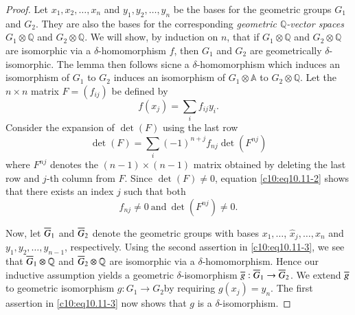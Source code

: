 \begin{proof}
  Let $x_1, x_2, \ldots , x_n$ and $y_1, y_2, \ldots, y_n$ be the
  bases for the geometric groups $G_1$ and $G_2$. They are also the
  bases for the corresponding \textit{geometric $\mathbb{Q}$-vector
    spaces $G_1 \otimes \mathbb{Q}$} and $G_2 \otimes \mathbb{Q}$. We
  will show, by induction on $n$, that if $G_1 \otimes \mathbb{Q}$ and
  $G_2 \otimes \mathbb{Q}$ are isomorphic via a $\delta$-homomorphism
  $f$, then $G_1$ and $G_2$ are geometrically $\delta$-isomorphic. The
  lemma then follows sicne a $\delta$-homomorphism which induces an
  isomorphism of $G_1$ to $G_2$ induces an isomorphism of $G_1 \otimes
  \mathbb{A}$ to $G_2 \otimes \mathbb{Q}$. Let the $n \times n$ matrix
  $F= (f_{ij})$ be defined by 
  \begin{equation*}
    f(x_j) = \sum_{i} f_{ij}y_i.\tag{1}\label{c10:eq10.11-1}
  \end{equation*}
  Consider the expansion of $\det (F)$ using the last row
  \begin{equation*}
    \det (F) = \sum_i (-1)^{n+j} f_{nj} \det (F^{nj})\tag{2}\label{c10:eq10.11-2}
  \end{equation*}
  where $F^{nj}$ denotes the $(n-1) \times (n-1)$ matrix obtained by
  deleting the last row and $j$-th column from $F$. Since $\det
  (F)\neq 0$, equation \eqref{c10:eq10.11-2} shows that there exists
  an index $j$ such that both
  \begin{equation*}
    f_{nj} \neq 0 ~\text{and}~ \det (F^{nj}) \neq
    0.\tag{3} \label{c10:eq10.11-3}
  \end{equation*}

Now, let $\overline{G}_1$ and $\overline{G}_2$ denote the geometric groups with
bases $x_1, \ldots$, $\hat{x}_j, \ldots, x_n$ and $y_1, y_2, \ldots,
y_{n-1}$, respectively. Using the second assertion in
\eqref{c10:eq10.11-3}, we see that $\overline{G}_1 \otimes \mathbb{Q}$ and
$\overline{G}_2 \otimes \mathbb{Q}$ are isomorphic via a
$\delta$-homomorphism. Hence our inductive assumption yields a
geometric $\delta$-isomorphism $\overline{g}: \overline{G}_1 \to \overline{G}_2$. We
extend $\overline{g}$ to geometric isomorphism $g: G_1 \to
G_2$\pageoriginale by requiring 
$g(x_j)= y_n$. The first assertion in \eqref{c10:eq10.11-3} now shows
that $g$ is a $\delta$-isomorphism.
\end{proof}

